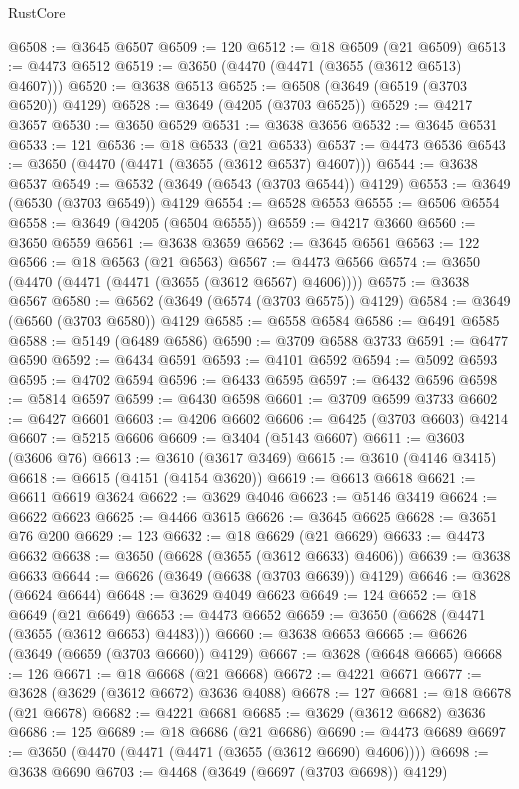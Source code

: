 \begin{lexlean}{RustCore}
\begin{coremodule}
@6508 := @3645 @6507
@6509 := 120
@6512 := @18 @6509 (@21 @6509)
@6513 := @4473 @6512
@6519 := @3650 (@4470 (@4471 (@3655 (@3612 @6513) @4607)))
@6520 := @3638 @6513
@6525 := @6508 (@3649 (@6519 (@3703 @6520)) @4129)
@6528 := @3649 (@4205 (@3703 @6525))
@6529 := @4217 @3657
@6530 := @3650 @6529
@6531 := @3638 @3656
@6532 := @3645 @6531
@6533 := 121
@6536 := @18 @6533 (@21 @6533)
@6537 := @4473 @6536
@6543 := @3650 (@4470 (@4471 (@3655 (@3612 @6537) @4607)))
@6544 := @3638 @6537
@6549 := @6532 (@3649 (@6543 (@3703 @6544)) @4129)
@6553 := @3649 (@6530 (@3703 @6549)) @4129
@6554 := @6528 @6553
@6555 := @6506 @6554
@6558 := @3649 (@4205 (@6504 @6555))
@6559 := @4217 @3660
@6560 := @3650 @6559
@6561 := @3638 @3659
@6562 := @3645 @6561
@6563 := 122
@6566 := @18 @6563 (@21 @6563)
@6567 := @4473 @6566
@6574 := @3650 (@4470 (@4471 (@4471 (@3655 (@3612 @6567) @4606))))
@6575 := @3638 @6567
@6580 := @6562 (@3649 (@6574 (@3703 @6575)) @4129)
@6584 := @3649 (@6560 (@3703 @6580)) @4129
@6585 := @6558 @6584
@6586 := @6491 @6585
@6588 := @5149 (@6489 @6586)
@6590 := @3709 @6588 @3733
@6591 := @6477 @6590
@6592 := @6434 @6591
@6593 := @4101 @6592
@6594 := @5092 @6593
@6595 := @4702 @6594
@6596 := @6433 @6595
@6597 := @6432 @6596
@6598 := @5814 @6597
@6599 := @6430 @6598
@6601 := @3709 @6599 @3733
@6602 := @6427 @6601
@6603 := @4206 @6602
@6606 := @6425 (@3703 @6603) @4214
@6607 := @5215 @6606
@6609 := @3404 (@5143 @6607)
@6611 := @3603 (@3606 @76)
@6613 := @3610 (@3617 @3469)
@6615 := @3610 (@4146 @3415)
@6618 := @6615 (@4151 (@4154 @3620))
@6619 := @6613 @6618
@6621 := @6611 @6619 @3624
@6622 := @3629 @4046
@6623 := @5146 @3419
@6624 := @6622 @6623
@6625 := @4466 @3615
@6626 := @3645 @6625
@6628 := @3651 @76 @200
@6629 := 123
@6632 := @18 @6629 (@21 @6629)
@6633 := @4473 @6632
@6638 := @3650 (@6628 (@3655 (@3612 @6633) @4606))
@6639 := @3638 @6633
@6644 := @6626 (@3649 (@6638 (@3703 @6639)) @4129)
@6646 := @3628 (@6624 @6644)
@6648 := @3629 @4049 @6623
@6649 := 124
@6652 := @18 @6649 (@21 @6649)
@6653 := @4473 @6652
@6659 := @3650 (@6628 (@4471 (@3655 (@3612 @6653) @4483)))
@6660 := @3638 @6653
@6665 := @6626 (@3649 (@6659 (@3703 @6660)) @4129)
@6667 := @3628 (@6648 @6665)
@6668 := 126
@6671 := @18 @6668 (@21 @6668)
@6672 := @4221 @6671
@6677 := @3628 (@3629 (@3612 @6672) @3636 @4088)
@6678 := 127
@6681 := @18 @6678 (@21 @6678)
@6682 := @4221 @6681
@6685 := @3629 (@3612 @6682) @3636
@6686 := 125
@6689 := @18 @6686 (@21 @6686)
@6690 := @4473 @6689
@6697 := @3650 (@4470 (@4471 (@4471 (@3655 (@3612 @6690) @4606))))
@6698 := @3638 @6690
@6703 := @4468 (@3649 (@6697 (@3703 @6698)) @4129)

\end{coremodule}
\end{lexlean}
